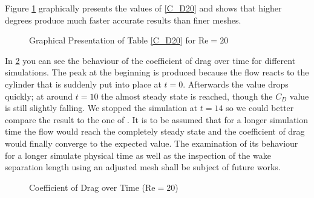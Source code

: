 Figure \ref{fig:C_D20} graphically presents the values of \cref{C_D20} and shows that higher degrees produce much faster accurate results than finer meshes. \\\indent
	\begin{figure}[htp]	
		\centering
		\caption{Graphical Presentation of Table \ref{C_D20} for $\text{Re} = 20$}
		\label{fig:C_D20}	
	\end{figure}
	In \cref{fig:C_Dt} you can see the behaviour of the coefficient of drag over time for different simulations. The peak at the beginning is produced because the flow reacts to the cylinder that is suddenly put into place at $t=0$. Afterwards the value drops quickly; at around $t=10$ the almost steady state is reached, though the $C_D$ value is still slightly falling. We stopped the simulation at $t=14$ so we could better compare the result to the one of \textcite{ayers}. It is to be assumed that for a longer simulation time the flow would reach the completely steady state and the coefficient of drag would finally converge to the expected value. The examination of its behaviour for a longer simulate physical time as well as the inspection of the wake separation length using an adjusted mesh shall be subject of future works.\\\indent
\begin{figure}[htp]	
	\centering
	\caption{Coefficient of Drag over Time ($\text{Re} = 20$)}
	\label{fig:C_Dt}	
\end{figure}
